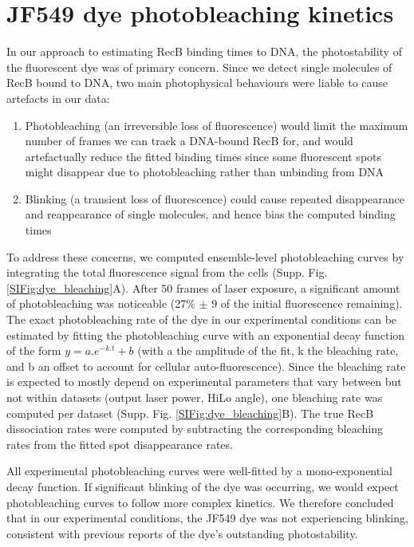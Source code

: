 \captionsetup*{format=largeformat}
\section{JF549 dye photobleaching kinetics}
\label{note:dye_bleaching} 

In our approach to estimating RecB binding times to DNA, the photostability of the fluorescent dye was of primary concern. Since we detect single molecules of RecB bound to DNA, two main photophysical behaviours were liable to cause artefacts in our data:
\begin{enumerate}
    \item Photobleaching (an irreversible loss of fluorescence) would limit the maximum number of frames we can track a DNA-bound RecB for, and would artefactually reduce the fitted binding times since some fluorescent spots might disappear due to photobleaching rather than unbinding from DNA
    \item Blinking (a transient loss of fluorescence) could cause repeated disappearance and reappearance of single molecules, and hence bias the computed binding times
\end{enumerate}

To address these concerns, we computed ensemble-level photobleaching curves by integrating the total fluorescence signal from the cells (Supp. Fig. \ref{SIFig:dye_bleaching}A). After 50 frames of laser exposure, a significant amount of photobleaching was noticeable (27\% $\pm$ 9 of the initial fluorescence remaining). The exact photobleaching rate of the dye in our experimental conditions can be estimated by fitting the photobleaching curve with an exponential decay function of the form $y=a.e^{-k.t}+b$ (with a the amplitude of the fit, k the bleaching rate, and b an offset to account for cellular auto-fluorescence). Since the bleaching rate is expected to mostly depend on experimental parameters that vary between but not within datasets (output laser power, HiLo angle), one bleaching rate was computed per dataset (Supp. Fig. \ref{SIFig:dye_bleaching}B). The true RecB dissociation rates were computed by subtracting the corresponding bleaching rates from the fitted spot disappearance rates.

All experimental photobleaching curves were well-fitted by a mono-exponential decay function. If significant blinking of the dye was occurring, we would expect photobleaching curves to follow more complex kinetics.\cite{Thedie2017} We therefore concluded that in our experimental conditions, the JF549 dye was not experiencing blinking, consistent with previous reports of the dye's outstanding photostability.\cite{Grimm2015}

